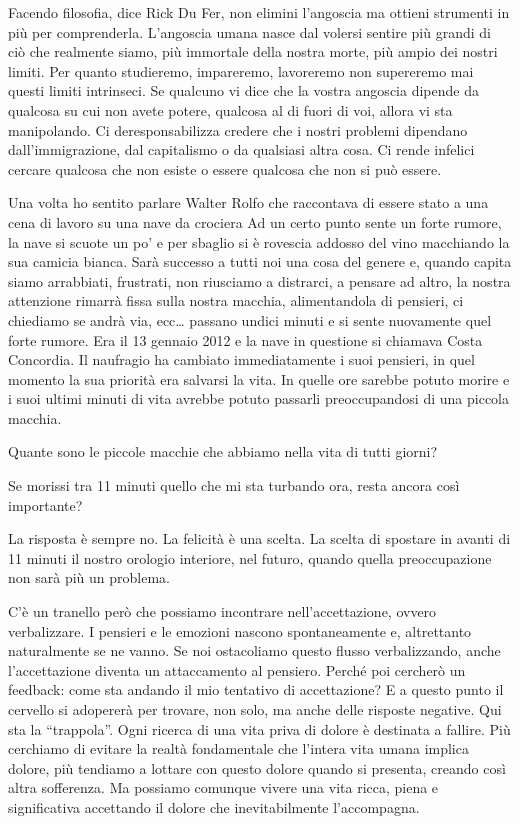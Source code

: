 \documentclass[12pt]{book} %
\begin{document}
Facendo filosofia, dice Rick Du Fer, non elimini l'angoscia ma ottieni strumenti in più per comprenderla. L'angoscia
umana nasce dal volersi sentire più grandi di ciò che realmente siamo, più immortale della nostra morte, più ampio dei
nostri limiti. Per quanto studieremo, impareremo, lavoreremo non supereremo mai questi limiti intrinseci. Se qualcuno
vi dice che la vostra angoscia dipende da qualcosa su cui non avete potere, qualcosa al di fuori di voi, allora vi sta
manipolando. Ci deresponsabilizza credere che i nostri problemi dipendano dall'immigrazione, dal
capitalismo o da qualsiasi altra cosa. Ci rende infelici cercare qualcosa che non esiste o essere qualcosa che non si
può essere.

Una volta ho sentito parlare Walter Rolfo che raccontava di essere stato a una cena di lavoro su una nave da crociera Ad
un certo punto sente un forte rumore, la nave si scuote un po' e per sbaglio si è rovescia addosso del vino macchiando
la sua camicia bianca. Sarà successo a tutti noi una cosa del genere e, quando capita siamo arrabbiati, frustrati, non
riusciamo a distrarci, a pensare ad altro, la nostra attenzione rimarrà fissa sulla nostra macchia, alimentandola di
pensieri, ci chiediamo se andrà via, ecc… passano undici minuti e si sente nuovamente quel forte rumore. Era il 13
gennaio 2012 e la nave in questione si chiamava Costa Concordia. Il naufragio ha cambiato immediatamente i suoi
pensieri, in quel momento la sua priorità era salvarsi la vita. In quelle ore sarebbe potuto morire e i suoi ultimi
minuti di vita avrebbe potuto passarli preoccupandosi di una piccola macchia.

Quante sono le piccole macchie che abbiamo nella vita di tutti giorni?

Se morissi tra 11 minuti quello che mi sta turbando ora, resta ancora così importante?

La risposta è sempre no. La felicità è una scelta. La scelta di spostare in avanti di 11 minuti il nostro orologio
interiore, nel futuro, quando quella preoccupazione non sarà più un problema.

C'è un tranello però che possiamo incontrare nell'accettazione, ovvero verbalizzare. I pensieri e
le emozioni nascono spontaneamente e, altrettanto naturalmente se ne vanno. Se noi ostacoliamo questo flusso
verbalizzando, anche l'accettazione diventa un attaccamento al pensiero. Perché poi cercherò un feedback: come sta
andando il mio tentativo di accettazione? E a questo punto il cervello si adopererà per trovare, non solo, ma anche
delle risposte negative. Qui sta la “trappola”. Ogni ricerca di una vita priva di dolore è destinata a fallire. Più
cerchiamo di evitare la realtà fondamentale che l'intera vita umana implica dolore, più tendiamo a
lottare con questo dolore quando si presenta, creando così altra sofferenza. Ma possiamo comunque vivere una vita
ricca, piena e significativa accettando il dolore che inevitabilmente l'accompagna.
\end{document}
